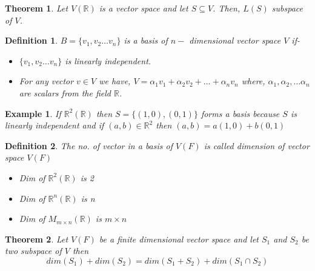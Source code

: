 \documentclass[12pt]{article}
\newcommand{\R}{\mathbb{R}}
\newtheorem{thm}{Theorem}
\newtheorem*{defn}{Definition}
\newtheorem{ex}{Example}
\begin{document}
\begin{thm}\normalfont
	Let $V(\R)$ is a vector space and let $S \subseteq V$. Then, $L(S)$ subspace of $V$. 
\end{thm}

\begin{defn}\normalfont
	$B = \{v_1,v_2 \dots v_n\}$ is a basis of $n-$ dimensional vector space $V$ if-
	\begin{itemize}
		\item $\{v_1,v_2 \dots v_n\}$ is linearly independent.
		\item For any vector $v\in V$ we have, $V = \alpha_1v_1+\alpha_2v_2+\dots +\alpha_nv_n$ where, $\alpha_1,\alpha_2,\dots \alpha_n$ are scalars from the field $\R$.
	\end{itemize}
\end{defn}
\begin{ex}\normalfont
	If $\R^2(\R)$ then $S=\{(1,0),(0,1)\}$ forms a \textit{basis} because $S$ is linearly independent and if $(a,b) \in \R^2$ then $(a,b)= a(1,0)+b(0,1)$
\end{ex}

\begin{defn}\normalfont
	The no. of vector in a \textit{basis} of $V(F)$ is called \textit{dimension} of vector space $V(F)$
	\begin{itemize}
		\item Dim of $\R^2(\R)$ is 2
		\item Dim of $\R^n(\R)$ is n
		\item Dim of $M_{m \times n}(\R)$ is $m\times n$
	\end{itemize}
\end{defn}

\begin{thm}\normalfont
	Let $V(F)$ be a finite dimensional vector space and let $S_1$ and $S_2$ be two subspace of $V$ then $$ dim(S_1) + dim(S_2) = dim(S_1+S_2)+dim(S_1 \cap S_2) $$
\end{thm}
\end{document}
